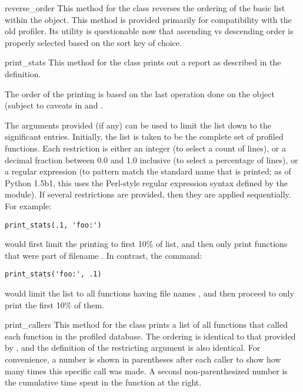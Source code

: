 \begin{methoddesc}[Stats]{reverse_order}{}
This method for the  class reverses the ordering of the basic
list within the object.  This method is provided primarily for
compatibility with the old profiler.  Its utility is questionable
now that ascending vs descending order is properly selected based on
the sort key of choice.
\end{methoddesc}

\begin{methoddesc}[Stats]{print_stats}{}
This method for the  class prints out a report as described
in the  definition.

The order of the printing is based on the last 
operation done on the object (subject to caveats in  and
.

The arguments provided (if any) can be used to limit the list down to
the significant entries.  Initially, the list is taken to be the
complete set of profiled functions.  Each restriction is either an
integer (to select a count of lines), or a decimal fraction between
0.0 and 1.0 inclusive (to select a percentage of lines), or a regular
expression (to pattern match the standard name that is printed; as of
Python 1.5b1, this uses the Perl-style regular expression syntax
defined by the  module).  If several restrictions are
provided, then they are applied sequentially.  For example:

\begin{verbatim}
print_stats(.1, 'foo:')
\end{verbatim}

would first limit the printing to first 10\% of list, and then only
print functions that were part of filename .  In
contrast, the command:

\begin{verbatim}
print_stats('foo:', .1)
\end{verbatim}

would limit the list to all functions having file names ,
and then proceed to only print the first 10\% of them.
\end{methoddesc}


\begin{methoddesc}[Stats]{print_callers}{}
This method for the  class prints a list of all functions
that called each function in the profiled database.  The ordering is
identical to that provided by , and the definition
of the restricting argument is also identical.  For convenience, a
number is shown in parentheses after each caller to show how many
times this specific call was made.  A second non-parenthesized number
is the cumulative time spent in the function at the right.
\end{methoddesc}

